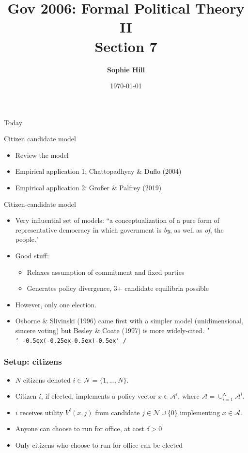 \documentclass[11pt,aspectratio=169]{beamer}
\title{Gov 2006: Formal Political Theory II \\
Section 7}
\date{\today}
\author{ \textbf{Sophie Hill}}
\def\shrug{\texttt{\raisebox{0.75em}{\char`\_}\char`\\\char`\_\kern-0.5ex(\kern-0.25ex\raisebox{0.25ex}{\rotatebox{45}{\raisebox{-.75ex}"\kern-1.5ex\rotatebox{-90})}}\kern-0.5ex)\kern-0.5ex\char`\_/\raisebox{0.75em}{\char`\_}}}
\begin{document}
  \maketitle
  
\begin{frame}{Today}

\Large 

 Citizen candidate model

\begin{itemize}
\item Review the model 
\item Empirical application 1: Chattopadhyay \& Duflo (2004)
\item Empirical application 2: Gro{\ss}er \& Palfrey (2019)
\end{itemize}

\end{frame}

\begin{frame}{Citizen-candidate model}

\begin{itemize}
\item Very influential set of models: ``a conceptualization of a pure form of representative democracy in which government is \textit{by}, as well as \textit{of}, the people."
\pause 
\item Good stuff:
\begin{itemize}
\item Relaxes assumption of commitment and fixed parties
\item Generates policy divergence, 3+ candidate equilibria possible
\end{itemize}
\pause 
\item However, only one election. 
\pause 
\item Osborne \& Slivinski (1996) came first with a simpler model (unidimensional, sincere voting) but Besley \& Coate (1997) is more widely-cited.  \small\shrug


\end{itemize}
\end{frame}

\begin{frame}
\frametitle{Setup: citizens}

\begin{itemize}
\item $N$ citizens denoted $i\in \mathcal{N} = \{1,...,N\}$.
\item Citizen $i$, if elected, implements a policy vector $x\in \mathcal{A}^i$, where $\mathcal{A}=\cup^N_{i=1} \mathcal{A}^i$.
\item $i$ receives utility $V^i(x,j)$ from candidate $j \in \mathcal{N} \cup \{0\}$ implementing $x\in \mathcal{A}$.
\item Anyone can choose to run for office, at cost $\delta > 0$
\item Only citizens who choose to run for office can be elected
\end{itemize}

\end{frame}
\end{document}
